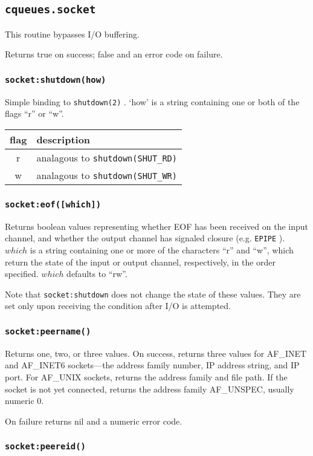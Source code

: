 \documentclass[11pt, oneside]{memoir}
\newcommand{\syscall}[1]{\texttt{#1} }
\newcommand{\fn}[1]{\texttt{#1} }
\newcommand{\errno}[1]{\texttt{#1} }
\newcounter{toccols}
\newenvironment{Module}[1]{
	\subsection{\texttt{#1}}
	\addtocontents{toc}{
		\protect\begin{multicols}{\value{toccols}}
	}
}{
	\addtocontents{toc}{\protect\end{multicols}}
}
\begin{document}
\begin{Module}{cqueues.socket}
This routine bypasses I/O buffering.

Returns true on success; false and an error code on failure.

\subsubsection[\fn{socket:shutdown}]{\fn{socket:shutdown(how)}}
Simple binding to \syscall{shutdown(2)}. `how' is a string containing one or both of the flags ``r'' or ``w''.

\begin{tabular}{c | l}
flag & description \\\hline
r & analagous to \syscall{shutdown(SHUT\_RD)} \\
w & analagous to \syscall{shutdown(SHUT\_WR)} \\
\end{tabular}

\subsubsection[\fn{socket:eof}]{\fn{socket:eof([which])}}
Returns boolean values representing whether EOF has been received on the input channel, and whether the output channel has signaled closure (e.g. \errno{EPIPE}). $which$ is a string containing one or more of the characters ``r'' and ``w'', which return the state of the input or output channel, respectively, in the order specified. $which$ defaults to ``rw''.

Note that \fn{socket:shutdown} does not change the state of these values. They are set only upon receiving the condition after I/O is attempted.

\subsubsection[\fn{socket:peername}]{\fn{socket:peername()}}
Returns one, two, or three values. On success, returns three values for AF\_INET and AF\_INET6 sockets---the address family number, IP address string, and IP port. For AF\_UNIX sockets, returns the address family and file path. If the socket is not yet connected, returns the address family AF\_UNSPEC, usually numeric 0.

On failure returns nil and a numeric error code.

\subsubsection[\fn{socket:peereid}]{\fn{socket:peereid()}}


\end{Module}
\end{document}
